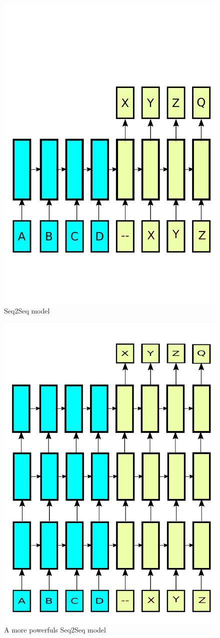 \documentclass[a4paper]{article}
\begin{document}
\begin{figure}
  \centering
  \includegraphics[width=.49\linewidth]{img/seq2seq.pdf}
  \caption{ Seq2Seq model}
  \label{fig:seq}
\end{figure}


\begin{figure}
  \centering
  \includegraphics[width=.49\linewidth]{img/seq2seq_deep.pdf}
  \caption{A more powerfuls Seq2Seq model}
  \label{fig:seqdeep}
\end{figure}
\end{document}
